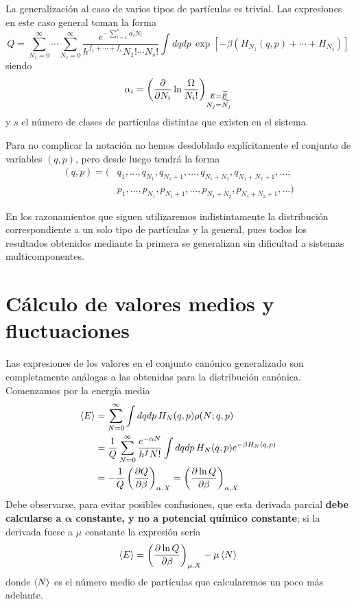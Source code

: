 La generalización al caso de varios tipos de partículas es trivial.
Las expresiones en este caso general toman la forma
\begin{equation}
	Q = \sum_{N_1 = 0}^\infty \cdots \sum_{N_s = 0}^\infty \frac{e^{-\sum_{i=1}^s \alpha_i N_i}}{h^{f_1 + \cdots + f_s} N_1!\cdots N_s!} \int dqdp \, \exp\left[ -\beta\left(  H_{N_1}(q,p) + \cdots + H_{N_s} \right) \right]
\end{equation}
siendo
$$\alpha_i = \left( \pdv{N_i} \ln \frac{\Omega}{N_i!} \right)_{\substack{E = \widetilde{E} \\ N_j = \widetilde{N_j}}} $$
y $s$ el número de clases de partículas distintas que existen en el sistema.

Para no complicar la notación no hemos desdoblado explícitamente el conjunto de variables $(q, p)$, pero desde luego tendrá la forma
\begin{align}
	(q, p) = (&q_1, \ldots ,q_{N_1},q_{N_1 + 1}, \ldots,q_{N_1 + N_2} ,q_{N_1 + N_2 +1},\ldots; \nonumber\\
	&p_1, \ldots, p_{N_1},p_{N_1 + 1}, \ldots,p_{N_1 + N_2} ,p_{N_1 + N_2 +1},\ldots)
\end{align}

En los razonamientos que siguen utilizaremos indistintamente la distribución correspondiente a un solo tipo de partículas y la general, pues todos los resultados obtenidos mediante la primera se generalizan sin dificultad a sistemas multicomponentes.

\section{Cálculo de valores medios y fluctuaciones}

Las expresiones de los valores en el conjunto canónico generalizado son completamente análogas a las obtenidas para la distribución canónica. Comenzamos por la energía media
\begin{align}
	\expval{E} &= \sum_{N = 0}^\infty \int dqdp \, H_N(q,p) \rho(N; q,p) \nonumber\\
							     &= \frac{1}{Q} \sum_{N = 0}^\infty \frac{e^{-\alpha N}}{h^f N!}\int dqdp \, H_N(q,p) e^{-\beta H_N(q,p)} \\
							     &= - \frac{1}{Q} \left( \pdv{Q}{\beta} \right)_{\alpha, X} = \left( \pdv{\ln Q}{\beta} \right)_{\alpha, X} \nonumber
\end{align}
Debe observarse, para evitar posibles confusiones, que esta derivada parcial \textbf{debe calcularse a $\bm{\alpha}$ constante, y no a potencial químico constante}; si la derivada fuese a $\mu$ constante la expresión sería
\begin{equation}
	\expval{E} = \left( \pdv{\ln Q}{\beta} \right)_{\mu, X} - \mu \expval{N}
\end{equation}
donde $\expval{N}$ es el número medio de partículas que calcularemos un poco más adelante.

